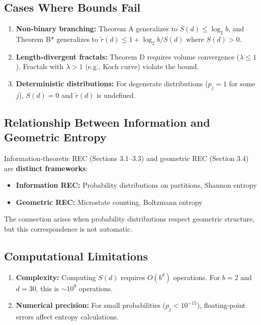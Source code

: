 \documentclass[11pt,a4paper]{article}
\theoremstyle{definition}
\theoremstyle{remark}
\newcommand{\Sbar}{\bar{S}}
\newcommand{\rtilde}{\tilde{r}}
\begin{document}
\subsection{Cases Where Bounds Fail}

\begin{enumerate}
    \item \textbf{Non-binary branching:} Theorem A generalizes to $\Sbar(d) \leq \log_2 b$, and Theorem B* generalizes to $\rtilde(d)\le 1+\log_2 b/S(d)$ where $S(d)>0$.
    
    \item \textbf{Length-divergent fractals:} Theorem D requires volume convergence ($\lambda \leq 1$). Fractals with $\lambda > 1$ (e.g., Koch curve) violate the bound.
    
    \item \textbf{Deterministic distributions:} For degenerate distributions ($p_j = 1$ for some $j$), $S(d) = 0$ and $\rtilde(d)$ is undefined.
\end{enumerate}

\subsection{Relationship Between Information and Geometric Entropy}

Information-theoretic REC (Sections 3.1--3.3) and geometric REC (Section 3.4) are \textbf{distinct frameworks}:

\begin{itemize}
    \item \textbf{Information REC:} Probability distributions on partitions, Shannon entropy
    \item \textbf{Geometric REC:} Microstate counting, Boltzmann entropy
\end{itemize}

The connection arises when probability distributions respect geometric structure, but this correspondence is not automatic.

\subsection{Computational Limitations}

\begin{enumerate}
    \item \textbf{Complexity:} Computing $S(d)$ requires $O(b^d)$ operations. For $b = 2$ and $d = 30$, this is $\sim 10^9$ operations.
    
    \item \textbf{Numerical precision:} For small probabilities ($p_j < 10^{-15}$), floating-point errors affect entropy calculations.
\end{enumerate}
\end{document}
